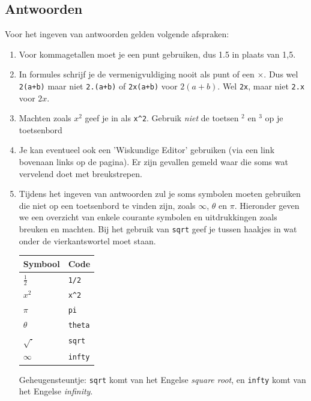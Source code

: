 \documentclass{ximera}
\begin{document}
\begin{onlineOnly}
 \subsection*{Antwoorden}
\begin{remark}
Voor het ingeven van antwoorden gelden volgende afspraken:
    \begin{enumerate}
        \item Voor kommagetallen moet je een punt gebruiken, dus 1.5 in plaats van 1,5.
        \item In formules schrijf je de vermenigvuldiging nooit als punt of een $\times$. Dus wel \verb|2(a+b)| maar niet \verb|2.(a+b)| of \verb|2x(a+b)| voor $2(a+b)$. Wel \verb|2x|, maar niet \verb|2.x| voor $2x$.
        \item Machten zoals $x^2$ geef je in als  \verb|x^2|. Gebruik \textit{niet} de toetsen ${}^2$ en ${}^3$ op je toetsenbord
        \item Je kan eventueel ook een 'Wiskundige Editor' gebruiken (via een link bovenaan links op de pagina). Er zijn gevallen gemeld waar die soms wat vervelend doet met breukstrepen.
         
    \item Tijdens het ingeven van antwoorden zul je soms symbolen moeten gebruiken die niet op een toetsenbord te vinden zijn, zoals $\infty$, $\theta$ en $\pi$. Hieronder geven we een overzicht van enkele courante symbolen en uitdrukkingen zoals breuken en machten. Bij het gebruik van \verb|sqrt| geef je tussen haakjes in wat onder de vierkantswortel moet staan.
 
\begin{center}
\def\arraystretch{1.5}
\begin{tabular}{l|l}
Symbool & Code \\
\hline
$\frac{1}{2}$ & \verb|1/2| \\
$x^2$ & \verb|x^2| \\
$\pi$ & \verb|pi| \\
$\theta$ & \verb|theta| \\
$\sqrt{\cdot}$ & \verb|sqrt| \\%
$\infty$ & \verb|infty| \\%
\end{tabular}
\end{center}
 
Geheugensteuntje: \verb|sqrt| komt van het Engelse \textit{square root}, en \verb|infty| komt van het Engelse \textit{infinity}.
    \end{enumerate}
 

\end{remark}
\end{onlineOnly}
\end{document}
